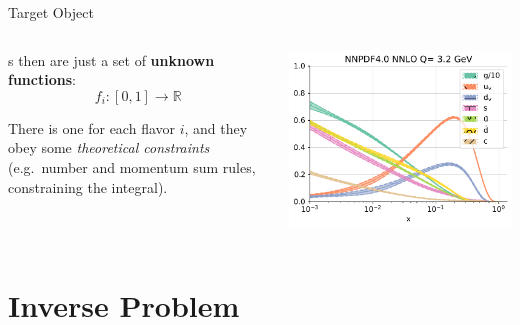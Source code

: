 \documentclass[9pt]{beamer}
\begin{document}
\begin{frame}{Target Object}
    \begin{columns}
        \begin{column}{0.5\textwidth}
            \pdf{}s then are just a set of \textbf{unknown functions}:
            \begin{equation*}
                f_i: [0, 1] \to \mathbb{R}
            \end{equation*}
            \vspace*{10pt}

            There is one for each flavor $i$, and they obey some
            \textit{theoretical constraints} (e.g.\ number and momentum sum
            rules, constraining the integral).
        \end{column}
        \begin{column}{0.5\textwidth}
            \begin{tcolorbox}
                \includegraphics[width=\textwidth]{pdfs_pdg_Qs0_plot_flavours}
            \end{tcolorbox}
        \end{column}
    \end{columns}
\end{frame}

\section{Inverse Problem}
\end{document}
